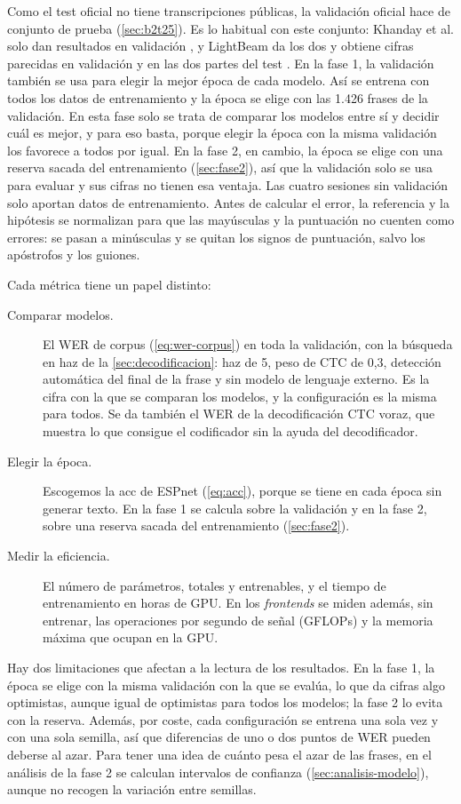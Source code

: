 Como el test oficial no tiene transcripciones públicas, la validación oficial hace de conjunto de prueba (\cref{sec:b2t25}). Es lo habitual con este conjunto: Khanday et al. solo dan resultados en validación \cite{khanday2026}, y LightBeam da los dos y obtiene cifras parecidas en validación y en las dos partes del test \cite{lightbeam}. En la fase 1, la validación también se usa para elegir la mejor época de cada modelo. Así se entrena con todos los datos de entrenamiento y la época se elige con las 1.426 frases de la validación. En esta fase solo se trata de comparar los modelos entre sí y decidir cuál es mejor, y para eso basta, porque elegir la época con la misma validación los favorece a todos por igual. En la fase 2, en cambio, la época se elige con una reserva sacada del entrenamiento (\cref{sec:fase2}), así que la validación solo se usa para evaluar y sus cifras no tienen esa ventaja. Las cuatro sesiones sin validación solo aportan datos de entrenamiento. Antes de calcular el error, la referencia y la hipótesis se normalizan para que las mayúsculas y la puntuación no cuenten como errores: se pasan a minúsculas y se quitan los signos de puntuación, salvo los apóstrofos y los guiones.

Cada métrica tiene un papel distinto:

\begin{description}
  \item[Comparar modelos.] El WER de corpus (\cref{eq:wer-corpus}) en toda la validación, con la búsqueda en haz de la \cref{sec:decodificacion}: haz de 5, peso de CTC de 0,3, detección automática del final de la frase y sin modelo de lenguaje externo. Es la cifra con la que se comparan los modelos, y la configuración es la misma para todos. Se da también el WER de la decodificación CTC voraz, que muestra lo que consigue el codificador sin la ayuda del decodificador.
  \item[Elegir la época.] Escogemos la acc de ESPnet (\cref{eq:acc}), porque se tiene en cada época sin generar texto. En la fase 1 se calcula sobre la validación y en la fase 2, sobre una reserva sacada del entrenamiento (\cref{sec:fase2}).
  \item[Medir la eficiencia.] El número de parámetros, totales y entrenables, y el tiempo de entrenamiento en horas de GPU. En los \textit{frontends} se miden además, sin entrenar, las operaciones por segundo de señal (GFLOPs) y la memoria máxima que ocupan en la GPU.
\end{description}

Hay dos limitaciones que afectan a la lectura de los resultados. En la fase 1, la época se elige con la misma validación con la que se evalúa, lo que da cifras algo optimistas, aunque igual de optimistas para todos los modelos; la fase 2 lo evita con la reserva. Además, por coste, cada configuración se entrena una sola vez y con una sola semilla, así que diferencias de uno o dos puntos de WER pueden deberse al azar. Para tener una idea de cuánto pesa el azar de las frases, en el análisis de la fase 2 se calculan intervalos de confianza (\cref{sec:analisis-modelo}), aunque no recogen la variación entre semillas.

